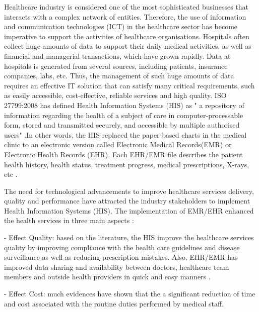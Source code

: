 
Healthcare industry is considered one of the most sophisticated businesses that interacts with a complex network of entities. Therefore, the use of information and communication technologies (ICT) in the healthcare sector has become imperative to support the activities of healthcare organisations. Hospitals often collect huge amounts of data to support their daily medical activities, as well as financial and managerial transactions, which have grown rapidly. Data at hospitals is generated from several sources, including patients, insurance companies, labs, etc. Thus, the management of such huge amounts of data requires an effective IT solution that can satisfy many critical requirements, such as easily accessible, cost-effective, reliable services and high quality. ISO 27799:2008 has defined Health Information Systems (HIS) as " a repository of information regarding the health of a subject of care in computer-processable form, stored and transmitted securely, and accessible by multiple authorised users" \cite{ISO2008}.In other words, the HIS replaced the paper-based charts in the medical clinic to an electronic version called Electronic Medical Records(EMR) or Electronic Health Records (EHR). Each EHR/EMR file describes the patient health history, health status, treatment progress, medical prescriptions, X-rays, etc \cite{OfHealth}. 

The need for technological advancements to improve healthcare services delivery, quality and performance have attracted the industry stakeholders to implement Health Information Systems (HIS). The implementation of EMR/EHR enhanced the health services in three main aspects \cite{chaudhry2006systematic,OfHealth}:


- Effect Quality: based on the literature, the HIS improve the healthcare services quality by improving compliance with the health care guidelines and disease surveillance as well as reducing prescription mistakes\cite{chaudhry2006systematic}. Also, EHR/EMR has improved data sharing and availability between doctors, healthcare team members and outside health providers in quick and easy manners \cite{OfHealth}.


- Effect Cost: much evidences have shown that the a significant reduction of time and cost associated with the routine duties performed by medical staff\cite{chaudhry2006systematic}.

